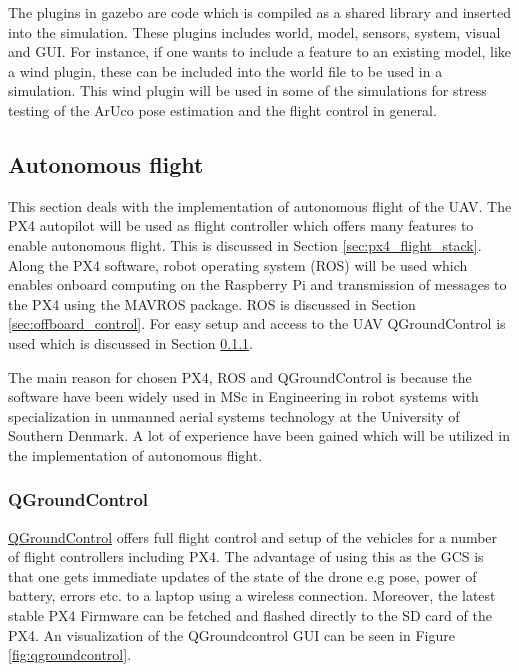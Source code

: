 \documentclass[../Head/report.tex]{subfiles}
\begin{document}
The plugins in gazebo are code which is compiled as a shared library and inserted into the simulation. These plugins includes world, model, sensors, system, visual and GUI. For instance, if one wants to include a feature to an existing model, like a wind plugin, these can be included into the world file to be used in a simulation. This wind plugin will be used in some of the simulations for stress testing of the ArUco pose estimation and the flight control in general.

\subsection{Autonomous flight}
\label{sec:autonomous_flight}

This section deals with the implementation of autonomous flight of the UAV. The PX4 autopilot will be used as flight controller which offers many features to enable autonomous flight. This is discussed in Section \ref{sec:px4_flight_stack}. Along the PX4 software, robot operating system (ROS) will be used which enables onboard computing on the Raspberry Pi and transmission of messages to the PX4 using the MAVROS package. ROS is discussed in Section \ref{sec:offboard_control}. For easy setup and access to the UAV QGroundControl is used which is discussed in Section \ref{sec:qgroundcontrol}. 

The main reason for chosen PX4, ROS and QGroundControl is because the software have been widely used in MSc in Engineering in robot systems with
specialization in unmanned aerial systems technology at the University of Southern Denmark. A lot of experience have been gained which will be utilized in the implementation of autonomous flight.

\subsubsection{QGroundControl}
\label{sec:qgroundcontrol}

\href{https://docs.qgroundcontrol.com/master/en/}{QGroundControl} offers full flight control and setup of the vehicles for a number of flight controllers including PX4. The advantage of using this as the GCS is that one gets immediate updates of the state of the drone e.g pose, power of battery, errors etc. to a laptop using a wireless connection.  Moreover, the latest stable PX4 Firmware can be fetched and flashed directly to the SD card of the PX4. An visualization of the QGroundcontrol GUI can be seen in Figure \ref{fig:qgroundcontrol}.
\end{document}
